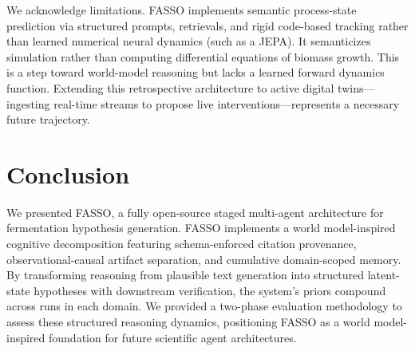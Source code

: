 \documentclass[11pt]{article}
\begin{document}
We acknowledge limitations. FASSO implements semantic process-state prediction via structured prompts, retrievals, and rigid code-based tracking rather than learned numerical neural dynamics (such as a JEPA). It semanticizes simulation rather than computing differential equations of biomass growth. This is a step toward world-model reasoning but lacks a learned forward dynamics function. Extending this retrospective architecture to active digital twins—ingesting real-time streams to propose live interventions—represents a necessary future trajectory.

\section{Conclusion}

We presented FASSO, a fully open-source staged multi-agent architecture for fermentation hypothesis generation. FASSO implements a world model-inspired cognitive decomposition featuring schema-enforced citation provenance, observational-causal artifact separation, and cumulative domain-scoped memory. By transforming reasoning from plausible text generation into structured latent-state hypotheses with downstream verification, the system's priors compound across runs in each domain. We provided a two-phase evaluation methodology to assess these structured reasoning dynamics, positioning FASSO as a world model-inspired foundation for future scientific agent architectures.
\end{document}
